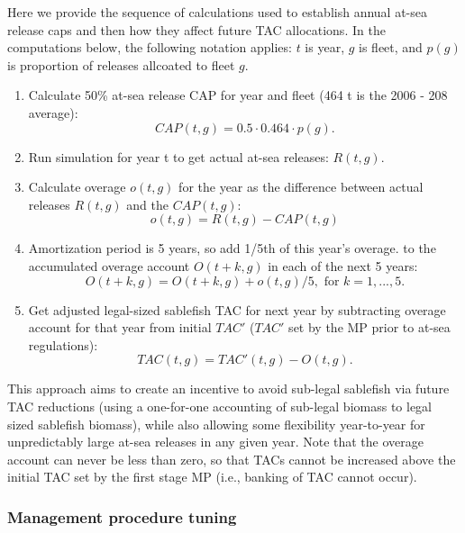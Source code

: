 \documentclass[11pt]{book}
\begin{document}
Here we provide the sequence of calculations used to establish annual at-sea release caps and then how they affect future TAC allocations. In the computations below, the following notation applies: \(t\) is year, \(g\) is fleet, and \(p(g)\) is proportion of releases allcoated to fleet \(g\).
\begin{enumerate}
\def\labelenumi{\arabic{enumi}.}

\item
  Calculate 50\% at-sea release CAP for year and fleet (464 t is the 2006 - 208 average): \begin{equation*}
        CAP(t,g) = 0.5 \cdot 0.464 \cdot p(g).
  \end{equation*}
\item
  Run simulation for year t to get actual at-sea releases: \(R(t,g)\).
\item
  Calculate overage \(o(t,g)\) for the year as the difference between actual releases \(R(t,g)\) and the \(CAP(t,g)\): \tabularnewline \begin{equation*}
        o(t,g) = R(t,g) - CAP(t,g)    
  \end{equation*}
\item
  Amortization period is 5 years, so add 1/5th of this year's overage. to the accumulated overage account \(O(t+k,g)\) in each of the next 5 years: \begin{equation*}
        O(t + k,g) = O(t+k,g) + o(t,g)/5, \mbox{ for } k = 1, ..., 5.
  \end{equation*}
\item
  Get adjusted legal-sized sablefish TAC for next year by subtracting overage account for that year from initial \(TAC'\) (\(TAC'\) set by the MP prior to at-sea regulations): \begin{equation*}
        TAC(t,g) = TAC'(t,g) - O(t,g).
  \end{equation*}
\end{enumerate}
This approach aims to create an incentive to avoid sub-legal sablefish via future TAC reductions (using a one-for-one accounting of sub-legal biomass to legal sized sablefish biomass), while also allowing some flexibility year-to-year for unpredictably large at-sea releases in any given year. Note that the overage account can never be less than zero, so that TACs cannot be increased above the initial TAC set by the first stage MP (i.e., banking of TAC cannot occur).

\hypertarget{management-procedure-tuning}{%
\subsubsection{Management procedure tuning}\label{management-procedure-tuning}}
\end{document}
